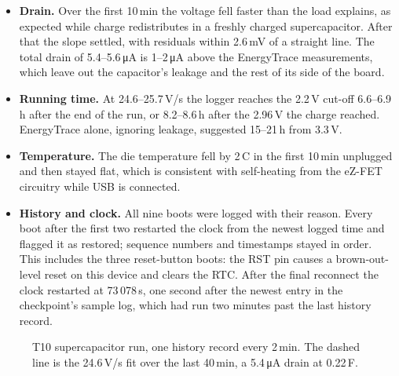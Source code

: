 \documentclass[11pt,a4paper]{article}
\newcommand{\uA}{\,\si{\micro\ampere}}
\begin{document}
\begin{itemize}
  \item \textbf{Drain.} Over the first 10\,min the voltage fell faster than the load explains, as expected while charge redistributes in a freshly charged supercapacitor. After that the slope settled, with residuals within 2.6\,mV of a straight line. The total drain of 5.4--5.6\uA{} is 1--2\uA{} above the EnergyTrace measurements, which leave out the capacitor's leakage and the rest of its side of the board.
  \item \textbf{Running time.} At 24.6--25.7\,\textmu V/s the logger reaches the 2.2\,V cut-off 6.6--6.9\,h after the end of the run, or 8.2--8.6\,h after the 2.96\,V the charge reached. EnergyTrace alone, ignoring leakage, suggested 15--21\,h from 3.3\,V.
  \item \textbf{Temperature.} The die temperature fell by 2\,\textdegree C in the first 10\,min unplugged and then stayed flat, which is consistent with self-heating from the eZ-FET circuitry while USB is connected.
  \item \textbf{History and clock.} All nine boots were logged with their reason. Every boot after the first two restarted the clock from the newest logged time and flagged it as restored; sequence numbers and timestamps stayed in order. This includes the three reset-button boots: the RST pin causes a brown-out-level reset on this device and clears the RTC. After the final reconnect the clock restarted at 73\,078\,s, one second after the newest entry in the checkpoint's sample log, which had run two minutes past the last history record.
\end{itemize}

\begin{figure}[tbp]
\centering
{}
\caption{T10 supercapacitor run, one history record every 2\,min. The dashed line is the 24.6\,\textmu V/s fit over the last 40\,min, a 5.4\uA{} drain at 0.22\,F.}
\label{fig:drain}
\end{figure}
\end{document}

